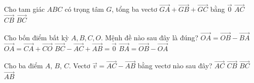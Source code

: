 \begin{ex}%
Cho tam giác $ABC$ có trọng tâm $G$, tổng ba vectơ $\overrightarrow{GA}+\overrightarrow{GB}+\overrightarrow{GC}$ bằng
\choice
{\True $\overrightarrow{0}$}
{$\overrightarrow{AC}$}
{$\overrightarrow{CB}$}
{$\overrightarrow{BC}$}
\end{ex}

\begin{ex}%
Cho bốn điểm bất kỳ $A,B,C,O$. Mệnh đề nào sau đây là đúng?
\choice
{$\overrightarrow{OA}=\overrightarrow{OB}-\overrightarrow{BA}$}
{$\overrightarrow{OA}=\overrightarrow{CA}+\overrightarrow{CO}$}
{\True $\overrightarrow{BC}-\overrightarrow{AC}+\overrightarrow{AB}=\overrightarrow{0}$}
{$\overrightarrow{BA}=\overrightarrow{OB}-\overrightarrow{OA}$}
\end{ex}

\begin{ex}%
Cho ba điểm $A$, $B$, $C$. Vectơ $\overrightarrow{v}=\overrightarrow{AC}-\overrightarrow{AB}$ bằng vectơ nào sau đây?
\choice
{$\overrightarrow{AC}$}
{$\overrightarrow{CB}$}
{\True $\overrightarrow{BC}$}
{$\overrightarrow{AB}$}
\end{ex}

